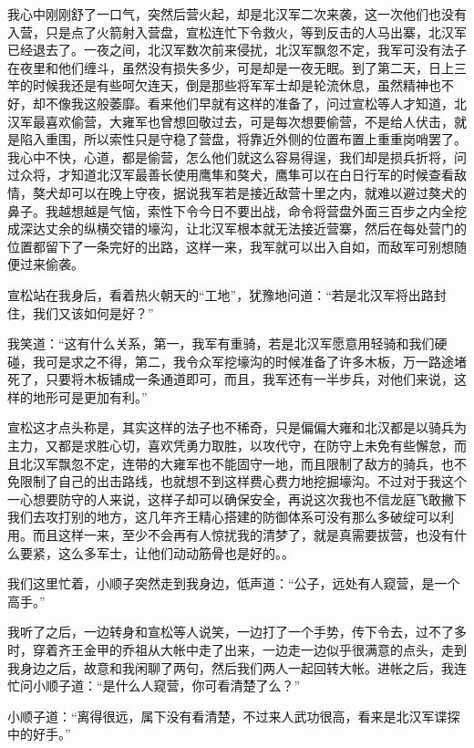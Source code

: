 我心中刚刚舒了一口气，突然后营火起，却是北汉军二次来袭，这一次他们也没有入营，只是点了火箭射入营盘，宣松连忙下令救火，等到反击的人马出寨，北汉军已经退去了。一夜之间，北汉军数次前来侵扰，北汉军飘忽不定，我军可没有法子在夜里和他们缠斗，虽然没有损失多少，可是却是一夜无眠。到了第二天，日上三竿的时候我还是有些呵欠连天，倒是那些将军军士却是轮流休息，虽然精神也不好，却不像我这般萎靡。看来他们早就有这样的准备了，问过宣松等人才知道，北汉军最喜欢偷营，大雍军也曾想回敬过去，可是每次想要偷营，不是给人伏击，就是陷入重围，所以索性只是守稳了营盘，将靠近外侧的位置布置上重重岗哨罢了。我心中不快，心道，都是偷营，怎么他们就这么容易得逞，我们却是损兵折将，问过众将，才知道北汉军最善长使用鹰隼和獒犬，鹰隼可以在白日行军的时候查看敌情，獒犬却可以在晚上守夜，据说我军若是接近敌营十里之内，就难以避过獒犬的鼻子。我越想越是气恼，索性下令今日不要出战，命令将营盘外面三百步之内全挖成深达丈余的纵横交错的壕沟，让北汉军根本就无法接近营寨，然后在每处营门的位置都留下了一条完好的出路，这样一来，我军就可以出入自如，而敌军可别想随便过来偷袭。

宣松站在我身后，看着热火朝天的“工地”，犹豫地问道：“若是北汉军将出路封住，我们又该如何是好？”

我笑道：“这有什么关系，第一，我军有重骑，若是北汉军愿意用轻骑和我们硬碰，我可是求之不得，第二，我令众军挖壕沟的时候准备了许多木板，万一路途堵死了，只要将木板铺成一条通道即可，而且，我军还有一半步兵，对他们来说，这样的地形可是更加有利。”

宣松这才点头称是，其实这样的法子也不稀奇，只是偏偏大雍和北汉都是以骑兵为主力，又都是求胜心切，喜欢凭勇力取胜，以攻代守，在防守上未免有些懈怠，而且北汉军飘忽不定，连带的大雍军也不能固守一地，而且限制了敌方的骑兵，也不免限制了自己的出击路线，也就想不到这样费心费力地挖掘壕沟。不过对于我这个一心想要防守的人来说，这样子却可以确保安全，再说这次我也不信龙庭飞敢撇下我们去攻打别的地方，这几年齐王精心搭建的防御体系可没有那么多破绽可以利用。而且这样一来，至少不会再有人惊扰我的清梦了，就是真需要拔营，也没有什么要紧，这么多军士，让他们动动筋骨也是好的。。

我们这里忙着，小顺子突然走到我身边，低声道：“公子，远处有人窥营，是一个高手。”

我听了之后，一边转身和宣松等人说笑，一边打了一个手势，传下令去，过不了多时，穿着齐王金甲的乔祖从大帐中走了出来，一边走一边似乎很满意的点头，走到我身边之后，故意和我闲聊了两句，然后我们两人一起回转大帐。进帐之后，我连忙问小顺子道：“是什么人窥营，你可看清楚了么？”

小顺子道：“离得很远，属下没有看清楚，不过来人武功很高，看来是北汉军谍探中的好手。”


